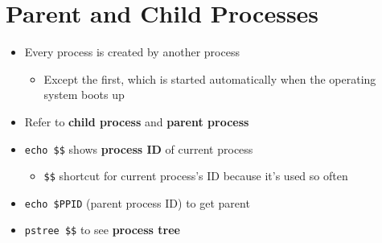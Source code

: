 \documentclass[krantzl]{krantz}
\newcommand{\glossref}[1]{\textbf{#1}}
\begin{document}
\section{Parent and Child Processes}
\begin{itemize}
\item Every process is created by another process\begin{itemize}
\item Except the first, which is started automatically when the operating system boots up

\end{itemize}


\item Refer to \glossref{child process} and \glossref{parent process}

\item \texttt{echo \$\$} shows \glossref{process ID} of current process\begin{itemize}
\item \texttt{\$\$} shortcut for current process’s ID because it’s used so often

\end{itemize}


\item \texttt{echo \$PPID} (parent process ID) to get parent

\item \texttt{pstree \$\$} to see \glossref{process tree}

\end{itemize}
\end{document}
